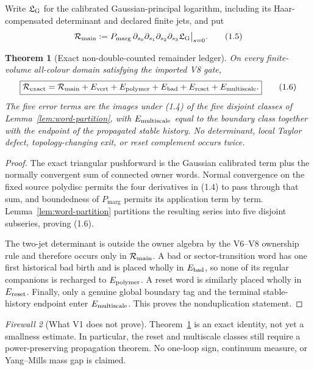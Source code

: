 \documentclass[11pt]{article}
\newtheorem{theorem}{Theorem}[section]
\theoremstyle{definition}
\theoremstyle{remark}
\newtheorem{firewall}[theorem]{Firewall}
\newcommand{\cR}{\mathcal R}
\newcommand{\Pm}{P_{\mathrm{marg}}}
\begin{document}
Write $\mathfrak L_{\rm G}$ for the calibrated Gaussian-principal logarithm,
including its Haar-compensated determinant and declared finite jets, and put
\[
 \cR_{\rm main}:=
 \Pm\,\partial_{s_0}\partial_{s_1}\partial_{s_2}
              \partial_{s_3}\mathfrak L_{\rm G}\big|_{s=0}. \tag{1.5}
\]

\begin{theorem}[Exact non-double-counted remainder ledger]
\label{thm:exact-ledger}
On every finite-volume all-colour domain satisfying the imported V8 gate,
\[
\boxed{
 \cR_{\rm exact}=\cR_{\rm main}
 +E_{\rm vert}+E_{\rm polymer}+E_{\rm bad}
 +E_{\rm reset}+E_{\rm multiscale}.}                         \tag{1.6}
\]
The five error terms are the images under (1.4) of the five disjoint classes
of Lemma~\ref{lem:word-partition}, with
$E_{\rm multiscale}$ equal to the boundary class together with the endpoint of
the propagated stable history.  No determinant, local Taylor defect,
topology-changing exit, or reset complement occurs twice.
\end{theorem}

\begin{proof}
The exact triangular pushforward is the Gaussian calibrated term plus the
normally convergent sum of connected owner words.  Normal convergence on the
fixed source polydisc permits the four derivatives in (1.4) to pass through
that sum, and boundedness of $\Pm$ permits its application term by term.
Lemma~\ref{lem:word-partition} partitions the resulting series into five
disjoint subseries, proving (1.6).

The two-jet determinant is outside the owner algebra by the V6--V8 ownership
rule and therefore occurs only in $\cR_{\rm main}$.  A bad or sector-transition
word has one first historical bad birth and is placed wholly in $E_{\rm bad}$,
so none of its regular companions is recharged to $E_{\rm polymer}$.  A reset
word is similarly placed wholly in $E_{\rm reset}$.  Finally, only a genuine
global boundary tag and the terminal stable-history endpoint enter
$E_{\rm multiscale}$.  This proves the nonduplication statement.
\end{proof}

\begin{firewall}[What V1 does not prove]
Theorem~\ref{thm:exact-ledger} is an exact identity, not yet a smallness
estimate.  In particular, the reset and multiscale classes still require a
power-preserving propagation theorem.  No one-loop sign, continuum measure,
or Yang--Mills mass gap is claimed.
\end{firewall}
\end{document}
